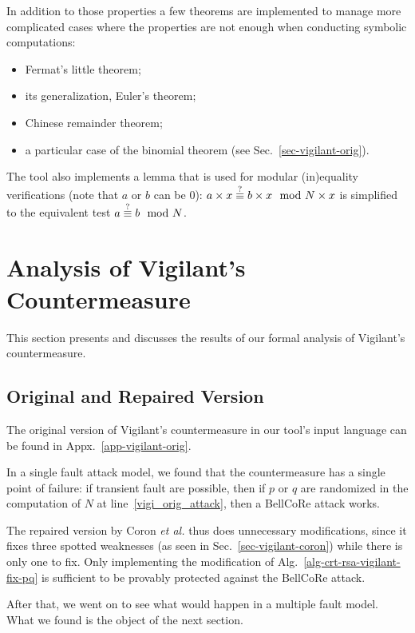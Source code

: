 \documentclass[10pt]{article}
\theoremstyle{definition}
\theoremstyle{theorem}
\newcommand{\etal}{\textit{et al.}\xspace}
\begin{document}
In addition to those properties a few theorems are implemented to manage more complicated cases where the properties are not enough when conducting symbolic computations:
\begin{itemize}
\item Fermat's little theorem;
\item its generalization, Euler's theorem;
\item Chinese remainder theorem;
\item a particular case of the binomial theorem (see Sec.~\ref{sec-vigilant-orig}).
\end{itemize}

The tool also implements a lemma that is used for modular (in)equality verifications (note that $a$ or $b$ can be $0$):
$a \times x \stackrel{{\smaller ?}}{\equiv} b \times x \mod N \times x$
is simplified to the equivalent test $a \stackrel{{\smaller ?}}{\equiv} b \mod N$.

\section{Analysis of Vigilant's Countermeasure}
\label{sec-analysis}

This section presents and discusses the results of our formal analysis of Vigilant's countermeasure.

\subsection{Original and Repaired Version}

The original version of Vigilant's countermeasure in our tool's input language can be found in Appx.~\ref{app-vigilant-orig}.

In a single fault attack model, we found that the countermeasure has a single point of failure:
if transient fault are possible, then if $p$ or $q$ are randomized in the computation of $N$ at line~\ref{vigi_orig_attack}, then a BellCoRe attack works.

The repaired version by Coron \etal thus does unnecessary modifications, since it fixes three spotted weaknesses (as seen in Sec.~\ref{sec-vigilant-coron}) while there is only one to fix.
Only implementing the modification of Alg.~\ref{alg-crt-rsa-vigilant-fix-pq} is sufficient to be provably protected against the BellCoRe attack.

After that, we went on to see what would happen in a multiple fault model.
What we found is the object of the next section.
\end{document}
